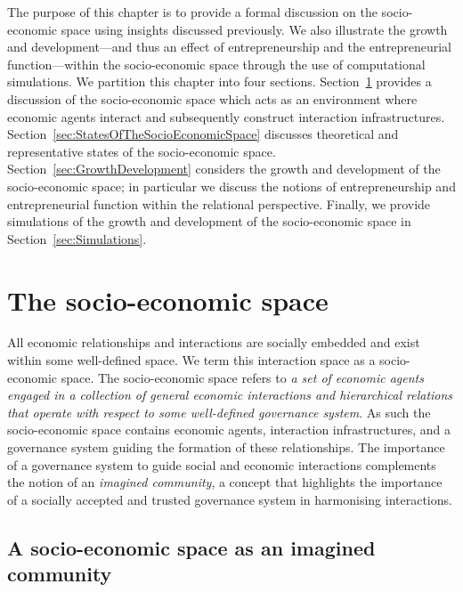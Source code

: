 The purpose of this chapter is to provide a formal discussion on the socio-economic space using insights discussed previously. We also illustrate the growth and development---and thus an effect of entrepreneurship and the entrepreneurial function---within the socio-economic space through the use of computational simulations. We partition this chapter into four sections. Section~\ref{sec:socio-economicspace} provides a discussion of the socio-economic space which acts as an environment where economic agents interact and subsequently construct interaction infrastructures. Section~\ref{sec:StatesOfTheSocioEconomicSpace} discusses theoretical and representative states of the socio-economic space. Section~\ref{sec:GrowthDevelopment} considers the growth and development of the socio-economic space; in particular we discuss the notions of entrepreneurship and entrepreneurial function within the relational perspective. Finally, we provide simulations of the growth and development of the socio-economic space in Section~\ref{sec:Simulations}.

\section{The socio-economic space} 
\label{sec:socio-economicspace}

All economic relationships and interactions are socially embedded and exist within some well-defined space. We term this interaction space as a socio-economic space. The socio-economic space refers to \emph{a set of economic agents engaged in a collection of general economic interactions and hierarchical relations that operate with respect to some well-defined governance system}. As such the socio-economic space contains economic agents, interaction infrastructures, and a governance system guiding the formation of these relationships. The importance of a governance system to guide social and economic interactions complements the notion of an \emph{imagined community}, a concept that highlights the importance of a socially accepted and trusted governance system in harmonising interactions.

\subsection{A socio-economic space as an imagined community}

